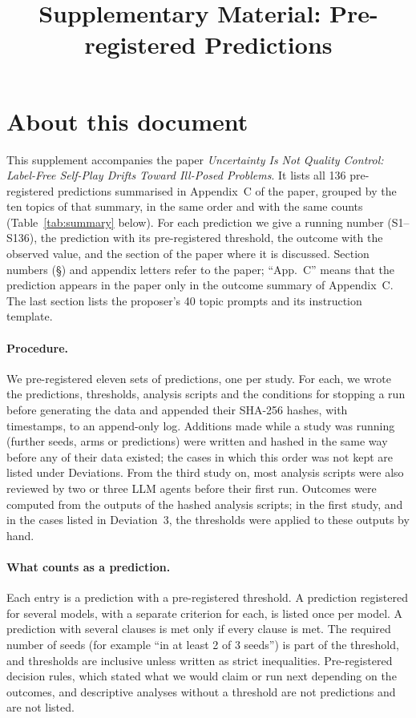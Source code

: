 \documentclass[10pt,a4paper]{article}
\title{Supplementary Material: Pre-registered Predictions}
\author{}
\date{}
\begin{document}
\maketitle
\vspace{-2.5em}

\section*{About this document}

This supplement accompanies the paper \emph{Uncertainty Is Not Quality Control: Label-Free Self-Play Drifts Toward Ill-Posed Problems}. It lists all 136 pre-registered predictions summarised in Appendix~C of the paper, grouped by the ten topics of that summary, in the same order and with the same counts (Table~\ref{tab:summary} below). For each prediction we give a running number (S1--S136), the prediction with its pre-registered threshold, the outcome with the observed value, and the section of the paper where it is discussed. Section numbers (\S) and appendix letters refer to the paper; ``App.~C'' means that the prediction appears in the paper only in the outcome summary of Appendix~C. The last section lists the proposer's 40 topic prompts and its instruction template.

\paragraph{Procedure.} We pre-registered eleven sets of predictions, one per study. For each, we wrote the predictions, thresholds, analysis scripts and the conditions for stopping a run before generating the data and appended their SHA-256 hashes, with timestamps, to an append-only log. Additions made while a study was running (further seeds, arms or predictions) were written and hashed in the same way before any of their data existed; the cases in which this order was not kept are listed under Deviations. From the third study on, most analysis scripts were also reviewed by two or three LLM agents before their first run. Outcomes were computed from the outputs of the hashed analysis scripts; in the first study, and in the cases listed in Deviation~3, the thresholds were applied to these outputs by hand.

\paragraph{What counts as a prediction.} Each entry is a prediction with a pre-registered threshold. A prediction registered for several models, with a separate criterion for each, is listed once per model. A prediction with several clauses is met only if every clause is met. The required number of seeds (for example ``in at least 2 of 3 seeds'') is part of the threshold, and thresholds are inclusive unless written as strict inequalities. Pre-registered decision rules, which stated what we would claim or run next depending on the outcomes, and descriptive analyses without a threshold are not predictions and are not listed.
\end{document}
